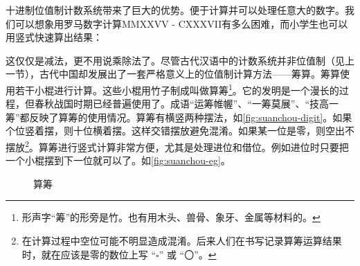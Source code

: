 \documentclass[b5paper]{ctexart}
\begin{document}
十进制位值制计数系统带来了巨大的优势。便于计算并可以处理任意大的数字。我们可以想象用罗马数字计算MMXXVV - CXXXVII有多么困难，而小学生也可以用竖式快速算出结果：

\begin{center}
\end{center}

这仅仅是减法，更不用说乘除法了。尽管古代汉语中的计数系统并非位值制（见上一节），古代中国却发展出了一套严格意义上的位值制计算方法——筹算。筹算使用若干小棍进行计算。这些小棍用竹子制成叫做算筹\footnote{形声字“筹”的形旁是竹。也有用木头、兽骨、象牙、金属等材料的。}。它的发明是一个漫长的过程，但春秋战国时期已经普遍使用了。成语“运筹帷幄”、“一筹莫展”、“技高一筹”都反映了算筹的使用情况。算筹有横竖两种摆法，如\cref{fig:suanchou-digit}。如果个位竖着摆，则十位横着摆。这样交错摆放避免混淆。如果某一位是零，则空出不摆放\footnote{在计算过程中空位可能不明显造成混淆。后来人们在书写记录算筹运算结果时，就在应该是零的数位上写 “$\square$” 或 “〇”。}。算筹进行竖式计算非常方便，尤其是处理进位和借位。例如进位时只要把一个小棍摆到下一位就可以了。如\cref{fig:suanchou-eg}。

\begin{figure}[htbp]
 \centering
 \caption{算筹}
\end{figure}
\end{document}

